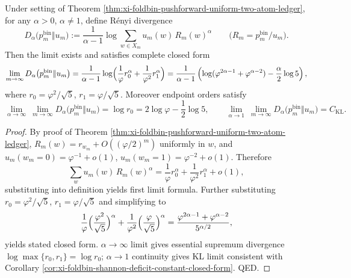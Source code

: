 \begin{proposition}\label{prop:xi-foldbin-renyi-deficit-spectrum-closed-form}
Under setting of Theorem \ref{thm:xi-foldbin-pushforward-uniform-two-atom-ledger}, for any \(\alpha>0\), \(\alpha\neq 1\), define Rényi divergence
\[
D_{\alpha}\bigl(p^{\mathrm{bin}}_m\Vert u_m\bigr)
:=\frac{1}{\alpha-1}\log\sum_{w\in X_m}u_m(w)\,R_m(w)^{\alpha}
\qquad\bigl(R_m=p^{\mathrm{bin}}_m/u_m\bigr).
\]
Then the limit exists and satisfies complete closed form
\[
\lim_{m\to\infty}D_{\alpha}\bigl(p^{\mathrm{bin}}_m\Vert u_m\bigr)
=\frac{1}{\alpha-1}\log\Bigl(\frac{1}{\varphi}r_0^\alpha+\frac{1}{\varphi^2}r_1^\alpha\Bigr)
=\frac{1}{\alpha-1}\left(
\log(\varphi^{2\alpha-1}+\varphi^{\alpha-2})-\frac{\alpha}{2}\log 5
\right),
\]
where \(r_0=\varphi^2/\sqrt5\), \(r_1=\varphi/\sqrt5\).
Moreover endpoint orders satisfy
\[
\lim_{\alpha\to\infty}\ \lim_{m\to\infty} D_{\alpha}\bigl(p^{\mathrm{bin}}_m\Vert u_m\bigr)
=\log r_0
=2\log\varphi-\frac12\log 5,
\qquad
\lim_{\alpha\to 1}\ \lim_{m\to\infty} D_{\alpha}\bigl(p^{\mathrm{bin}}_m\Vert u_m\bigr)
=C_{\mathrm{KL}}.
\]
\end{proposition}
\begin{proof}
By proof of Theorem \ref{thm:xi-foldbin-pushforward-uniform-two-atom-ledger}, \(R_m(w)=r_{w_m}+O((\varphi/2)^m)\) uniformly in \(w\), and \(u_m(w_m=0)=\varphi^{-1}+o(1)\), \(u_m(w_m=1)=\varphi^{-2}+o(1)\).
Therefore
\[
\sum_{w}u_m(w)\,R_m(w)^\alpha
=\frac{1}{\varphi}r_0^\alpha+\frac{1}{\varphi^2}r_1^\alpha+o(1),
\]
substituting into definition yields first limit formula.
Further substituting \(r_0=\varphi^2/\sqrt5\), \(r_1=\varphi/\sqrt5\) and simplifying to
\[
\frac{1}{\varphi}\Bigl(\frac{\varphi^2}{\sqrt5}\Bigr)^\alpha+\frac{1}{\varphi^2}\Bigl(\frac{\varphi}{\sqrt5}\Bigr)^\alpha
=\frac{\varphi^{2\alpha-1}+\varphi^{\alpha-2}}{5^{\alpha/2}},
\]
yields stated closed form.
\(\alpha\to\infty\) limit gives essential supremum divergence \(\log\max\{r_0,r_1\}=\log r_0\);
\(\alpha\to 1\) continuity gives KL limit consistent with Corollary \ref{cor:xi-foldbin-shannon-deficit-constant-closed-form}. QED.
\end{proof}


